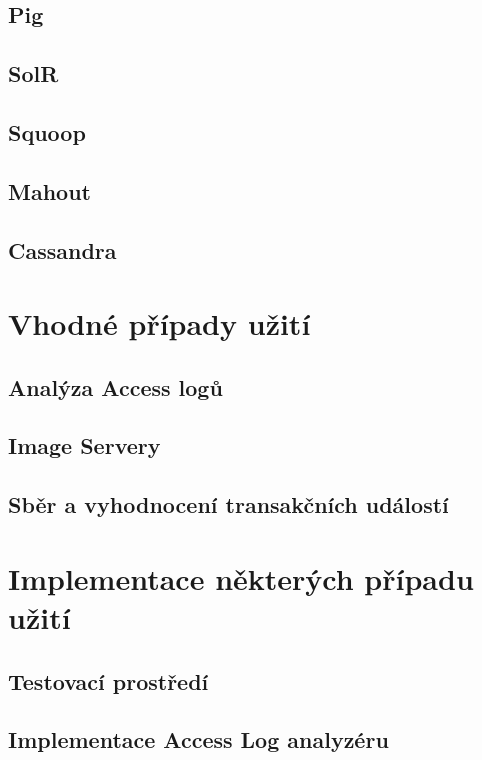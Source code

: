 \documentclass[thesis=M,czech]{FITthesis}[2012/06/26]
\begin{document}
\section{Pig}
\section{SolR}
\section{Squoop}
\section{Mahout}
\section{Cassandra}

\chapter{Vhodné případy užití}
\section{Analýza Access logů}
\section{Image Servery}
\section{Sběr a vyhodnocení transakčních událostí}


\chapter{Implementace některých případu užití}
\section{Testovací prostředí}
\section{Implementace Access Log analyzéru}

\begin{conclusion}
\end{conclusion}

\nocite{*}


\end{document}

